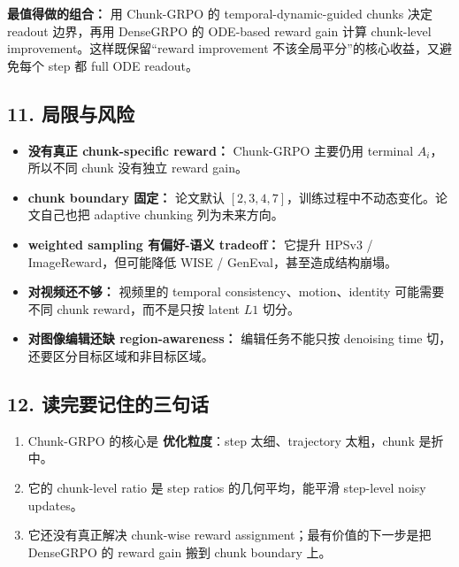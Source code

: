 \begin{summarybox}
\textbf{最值得做的组合：} 用 Chunk-GRPO 的 temporal-dynamic-guided chunks 决定 readout 边界，再用 DenseGRPO 的 ODE-based reward gain 计算 chunk-level improvement。这样既保留“reward improvement 不该全局平分”的核心收益，又避免每个 step 都 full ODE readout。
\end{summarybox}

\subsection{11. 局限与风险}

\begin{itemize}[leftmargin=1.5em]
  \item \textbf{没有真正 chunk-specific reward：} Chunk-GRPO 主要仍用 terminal \(A_i\)，所以不同 chunk 没有独立 reward gain。
  \item \textbf{chunk boundary 固定：} 论文默认 \([2,3,4,7]\)，训练过程中不动态变化。论文自己也把 adaptive chunking 列为未来方向。
  \item \textbf{weighted sampling 有偏好-语义 tradeoff：} 它提升 HPSv3 / ImageReward，但可能降低 WISE / GenEval，甚至造成结构崩塌。
  \item \textbf{对视频还不够：} 视频里的 temporal consistency、motion、identity 可能需要不同 chunk reward，而不是只按 latent \(L1\) 切分。
  \item \textbf{对图像编辑还缺 region-awareness：} 编辑任务不能只按 denoising time 切，还要区分目标区域和非目标区域。
\end{itemize}

\subsection{12. 读完要记住的三句话}

\begin{enumerate}[leftmargin=1.5em]
  \item Chunk-GRPO 的核心是 \textbf{优化粒度}：step 太细、trajectory 太粗，chunk 是折中。
  \item 它的 chunk-level ratio 是 step ratios 的几何平均，能平滑 step-level noisy updates。
  \item 它还没有真正解决 chunk-wise reward assignment；最有价值的下一步是把 DenseGRPO 的 reward gain 搬到 chunk boundary 上。
\end{enumerate}
